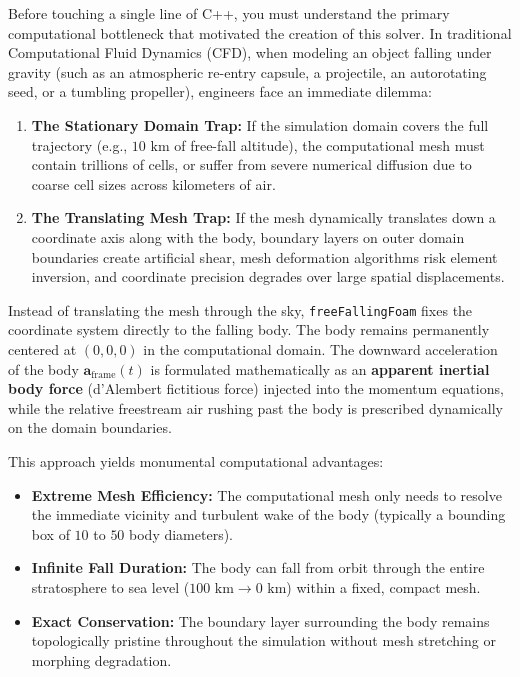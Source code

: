 \documentclass[11pt,a4paper]{article}
\newcommand{\vect}[1]{\mathbf{#1}}
\newcommand{\aframe}{\vect{a}_{\mathrm{frame}}}
\begin{document}
Before touching a single line of C++, you must understand the primary computational bottleneck that motivated the creation of this solver. 
In traditional Computational Fluid Dynamics (CFD), when modeling an object falling under gravity (such as an atmospheric re-entry capsule, a projectile, an autorotating seed, or a tumbling propeller), engineers face an immediate dilemma:
\begin{enumerate}
    \item \textbf{The Stationary Domain Trap:} If the simulation domain covers the full trajectory (e.g., $10\text{ km}$ of free-fall altitude), the computational mesh must contain trillions of cells, or suffer from severe numerical diffusion due to coarse cell sizes across kilometers of air.
    \item \textbf{The Translating Mesh Trap:} If the mesh dynamically translates down a coordinate axis along with the body, boundary layers on outer domain boundaries create artificial shear, mesh deformation algorithms risk element inversion, and coordinate precision degrades over large spatial displacements.
\end{enumerate}

\begin{theorybox}
Instead of translating the mesh through the sky, \texttt{freeFallingFoam} fixes the coordinate system directly to the falling body. 
The body remains permanently centered at $(0, 0, 0)$ in the computational domain.
The downward acceleration of the body $\aframe(t)$ is formulated mathematically as an \textbf{apparent inertial body force} (d'Alembert fictitious force) injected into the momentum equations, while the relative freestream air rushing past the body is prescribed dynamically on the domain boundaries.
\end{theorybox}

This approach yields monumental computational advantages:
\begin{itemize}
    \item \textbf{Extreme Mesh Efficiency:} The computational mesh only needs to resolve the immediate vicinity and turbulent wake of the body (typically a bounding box of $10$ to $50$ body diameters).
    \item \textbf{Infinite Fall Duration:} The body can fall from orbit through the entire stratosphere to sea level ($100\text{ km} \to 0\text{ km}$) within a fixed, compact mesh.
    \item \textbf{Exact Conservation:} The boundary layer surrounding the body remains topologically pristine throughout the simulation without mesh stretching or morphing degradation.
\end{itemize}
\end{document}
